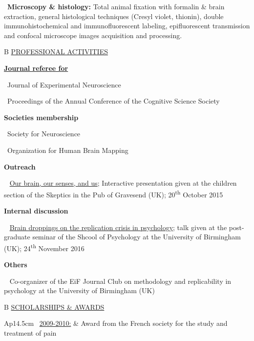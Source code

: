 \documentclass[a4paper,12pt,oneside]{letter}
\begin{document}
{\textbullet~\textbf{Microscopy \& histology:} Total animal fixation with formalin \& brain extraction, general histological techniques (Cresyl violet, thionin), double immunohistochemical and immunofluorescent labeling, epifluorescent transmission and confocal microscope images acquisition and processing.


\medskip 

\begin{tabular}{B}
\underline{PROFESSIONAL ACTIVITIES}
\end{tabular}


\href{http://publons.com/author/1205193/remi-gau#profile}{\textbf{Journal referee for} }

\textbullet~Journal of Experimental Neuroscience

\textbullet~Proceedings of the Annual Conference of the Cognitive Science Society


\textbf{Societies membership}

\textbullet~Society for Neuroscience

\textbullet~Organization for Human Brain Mapping


\textbf{Outreach}

\textbullet~ \href{https://dx.doi.org/10.6084/m9.figshare.4535423.v1}{Our brain, our senses, and us}; Interactive presentation given at the children section of the Skeptics in the Pub of Gravesend (UK); 20\textsuperscript{th} October 2015


\textbf{Internal discussion}

\textbullet~ \href{https://dx.doi.org/10.6084/m9.figshare.4257992.v1}{Brain droppings on the replication crisis in psychology}; talk given at the post-graduate seminar of the Shcool of Psychology at the University of Birmingham (UK); 24\textsuperscript{th} November 2016


\textbf{Others}

\textbullet~ Co-organizer of the EiF Journal Club on methodology and replicability in psychology at the University of Birmingham (UK)



\medskip 

\begin{tabular}{B}
\underline{SCHOLARSHIPS \& AWARDS}
\end{tabular}

\begin{tabular}{Ap{14.5cm}}
\textbullet~\underline{2009-2010:} & Award from the French society for the study and treatment of pain\\
     

\end{tabular}}
\end{document}
